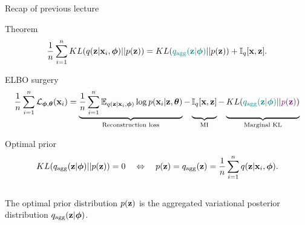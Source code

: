\begin{frame}{Recap of previous lecture}
	\begin{block}{Theorem}
		\vspace{-0.6cm}
		\[
			\frac{1}{n} \sum_{i=1}^n KL(q(\mathbf{z} | \mathbf{x}_i, \boldsymbol{\phi}) || p(\mathbf{z})) = KL({\color{teal}q_{\text{agg}}(\mathbf{z} | \boldsymbol{\phi}) }|| p(\mathbf{z})) + \mathbb{I}_{q} [\mathbf{x}, \mathbf{z}].
		\]
		\vspace{-0.6cm}
	\end{block}
	\begin{block}{ELBO surgery}
		\vspace{-0.5cm}
		{\small
		\[
		    \frac{1}{n} \sum_{i=1}^n \cL_{\bphi, \btheta}(\bx_i) = \underbrace{\frac{1}{n} \sum_{i=1}^n \mathbb{E}_{q(\bz | \bx_i, \bphi)} \log p(\bx_i | \bz, \btheta)}_{\text{Reconstruction loss}}
		    - \underbrace{\vphantom{ \sum_{i=1}^n} \bbI_q [\bx, \bz]}_{\text{MI}} - \underbrace{\vphantom{ \sum_{i=1}^n} KL({\color{teal}q_{\text{agg}}(\bz | \bphi)} || {\color{violet}p(\bz)})}_{\text{Marginal KL}}
		\]}
	\end{block}
	\vspace{-0.7cm}
	\begin{block}{Optimal prior}
		\vspace{-0.7cm}
		\[
			KL(q_{\text{agg}}(\mathbf{z} | \boldsymbol{\phi}) || p(\mathbf{z})) = 0 \quad \Leftrightarrow \quad p (\mathbf{z}) = q_{\text{agg}}(\mathbf{z}) = \frac{1}{n} \sum_{i=1}^n q(\mathbf{z} | \mathbf{x}_i, \boldsymbol{\phi}).
		\]
		\vspace{-0.5cm}\\
		The optimal prior distribution $p(\mathbf{z})$ is the aggregated variational posterior distribution $q_{\text{agg}}(\mathbf{z} | \boldsymbol{\phi})$.
	\end{block}
\end{frame}
